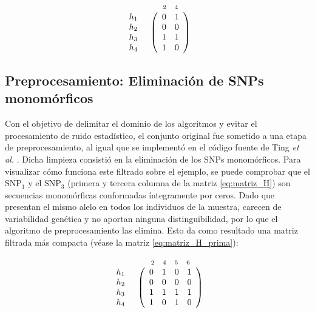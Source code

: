 \begin{equation}\label{eq:matriz_tag}
\begin{array}{cc}
 & \begin{array}{cc}
 \text{\scriptsize 2} & \text{\scriptsize 4}
 \end{array} \\
 \begin{array}{c} h_1 \\ h_2 \\ h_3 \\ h_4 \end{array} &
 \left(\begin{array}{cc}
 0 & 1 \\
 0 & 0 \\
 1 & 1 \\
 1 & 0 
 \end{array}\right)
\end{array}
\end{equation}

\subsection{Preprocesamiento: Eliminación de SNPs monomórficos}
Con el objetivo de delimitar el dominio de los algoritmos y evitar el procesamiento de ruido estadístico, el conjunto original fue sometido a una etapa de preprocesamiento, al igual que se implementó en el código fuente de Ting \textit{et al.} \cite{ting2010multi}. Dicha limpieza consistió en la eliminación de los SNPs monomórficos. Para visualizar cómo funciona este filtrado sobre el ejemplo, se puede comprobar que el $\text{SNP}_1$ y el $\text{SNP}_3$ (primera y tercera columna de la matriz \ref{eq:matriz_H}) son secuencias monomórficas conformadas íntegramente por ceros. Dado que presentan el mismo alelo en todos los individuos de la muestra, carecen de variabilidad genética y no aportan ninguna distinguibilidad, por lo que el algoritmo de preprocesamiento las elimina. Esto da como resultado una matriz filtrada más compacta (véase la matriz \ref{eq:matriz_H_prima}):

\begin{equation}\label{eq:matriz_H_prima}
\begin{array}{cc}
 & \begin{array}{cccc}
 \text{\scriptsize 2} & \text{\scriptsize 4} & \text{\scriptsize 5} & \text{\scriptsize 6}
 \end{array} \\
 \begin{array}{c} h_1 \\ h_2 \\ h_3 \\ h_4 \end{array} &
 \left(\begin{array}{cccc}
 0 & 1 & 0 & 1 \\
 0 & 0 & 0 & 0 \\
 1 & 1 & 1 & 1 \\
 1 & 0 & 1 & 0 
 \end{array}\right)
\end{array}
\end{equation}

